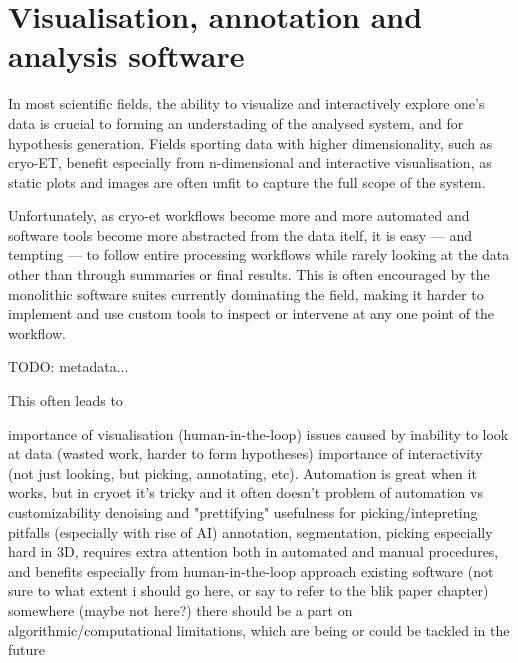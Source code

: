 \chapter{Visualisation, annotation and analysis software}

In most scientific fields, the ability to visualize and interactively explore one's data is crucial to forming an understading of the analysed system, and for hypothesis generation.
Fields sporting data with higher dimensionality, such as cryo-ET, benefit especially from n-dimensional and interactive visualisation, as static plots and images are often unfit to capture the full scope of the system.

Unfortunately, as cryo-et workflows become more and more automated and software tools become more abstracted from the data itelf, it is easy --- and tempting --- to follow entire processing workflows while rarely looking at the data other than through summaries or final results.
This is often encouraged by the monolithic software suites currently dominating the field, making it harder to implement and use custom tools to inspect or intervene at any one point of the workflow.

TODO: metadata...

This often leads to 


\begin{outline}
\1 importance of visualisation (human-in-the-loop)
    \2 issues caused by inability to look at data (wasted work, harder to form hypotheses)
    \2 importance of interactivity (not just looking, but picking, annotating, etc). Automation is great when it works, but in cryoet it's tricky and it often doesn't
        \3 problem of automation vs customizability
\1 denoising and "prettifying"
    \2 usefulness for picking/intepreting
    \2 pitfalls (especially with rise of AI)
\1 annotation, segmentation, picking
    \2 especially hard in 3D, requires extra attention both in automated and manual procedures, and benefits especially from human-in-the-loop approach
    \2 existing software (not sure to what extent i should go here, or say to refer to the blik paper chapter)
\1 somewhere (maybe not here?) there should be a part on algorithmic/computational limitations, which are being or could be tackled in the future
\end{outline}
